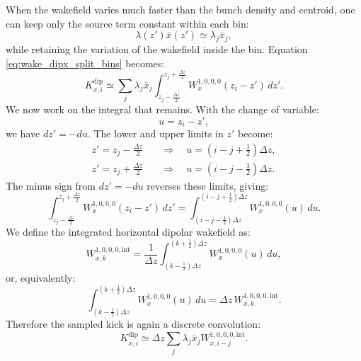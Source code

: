 When the wakefield varies much faster than the bunch density and centroid, one
can keep only the source term constant within each bin:
\begin{equation}
    \lambda(z')\bar{x}(z') \simeq \lambda_j\bar{x}_j,
\end{equation}
while retaining the variation of the wakefield inside the bin.
Equation\,\eqref{eq:wake_dipx_split_bins} becomes:
\begin{equation}
    K_{x,i}^\mathrm{dip} \simeq
    \sum_j \lambda_j\bar{x}_j
    \int_{z_j-\frac{\Delta z}{2}}^{z_j+\frac{\Delta z}{2}}
    W_x^{1,0,0,0}(z_i-z')\, dz' .
\end{equation}
We now work on the integral that remains. With the change of variable:
\begin{equation}
    u = z_i-z',
\end{equation}
we have $dz'=-du$. The lower and upper limits in $z'$ become:
\begin{align}
    z' = z_j-\frac{\Delta z}{2}
    &\quad\Rightarrow\quad
    u = \left(i-j+\frac{1}{2}\right)\Delta z,\\
    z' = z_j+\frac{\Delta z}{2}
    &\quad\Rightarrow\quad
    u = \left(i-j-\frac{1}{2}\right)\Delta z .
\end{align}
The minus sign from $dz'=-du$ reverses these limits, giving:
\begin{equation}
    \int_{z_j-\frac{\Delta z}{2}}^{z_j+\frac{\Delta z}{2}}
    W_x^{1,0,0,0}(z_i-z')\, dz'
    =
    \int_{\left(i-j-\frac{1}{2}\right)\Delta z}
         ^{\left(i-j+\frac{1}{2}\right)\Delta z}
    W_x^{1,0,0,0}(u)\, du.
\end{equation}
We define the integrated horizontal dipolar wakefield as:
\begin{equation}
    W_{x,k}^{1,0,0,0,\mathrm{int}} =
    \frac{1}{\Delta z}
    \int_{\left(k-\frac{1}{2}\right)\Delta z}
         ^{\left(k+\frac{1}{2}\right)\Delta z}
    W_x^{1,0,0,0}(u)\, du ,
    \label{eq:wake_dipx_int_def}
\end{equation}
or, equivalently:
\begin{equation}
    \int_{\left(k-\frac{1}{2}\right)\Delta z}
         ^{\left(k+\frac{1}{2}\right)\Delta z}
    W_x^{1,0,0,0}(u)\, du
    =
    \Delta z\,W_{x,k}^{1,0,0,0,\mathrm{int}}.
\end{equation}
Therefore the sampled kick is again a discrete convolution:
\begin{equation}
    K_{x,i}^\mathrm{dip} \simeq
    \Delta z
    \sum_j
    \lambda_j\bar{x}_j
    W_{x,i-j}^{1,0,0,0,\mathrm{int}}.
    \label{eq:wake_dipx_disc_integrated}
\end{equation}

